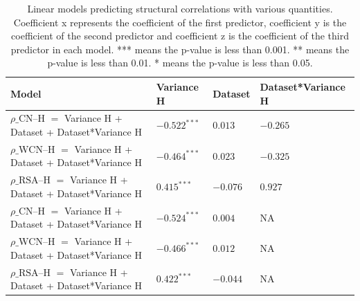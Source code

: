 \documentclass[12pt]{article}
\begin{document}
\begin{center}
	\begin{table}[H]
	\begin{tabular}{ | p{5.0cm} | p{3cm} | p{3cm} | p{4cm} | }
	\hline
	Model & Variance H  & Dataset & Dataset*Variance H \\	
	\hline
	$\rho  \text{\_CN--H}$ $ = $ Variance H + Dataset + Dataset*Variance H & $-0.522^{***}$ &  $0.013$ & $-0.265$ \\[1.3cm] 	
	
	$\rho  \text{\_WCN--H}$ $ = $ Variance H + Dataset + Dataset*Variance H& $-0.464^{***}$ &  $0.023$ & $-0.325$ \\ [1.3cm] 	
	
	$\rho  \text{\_RSA--H}$ $ = $ Variance H + Dataset + Dataset*Variance H & $0.415^{***}$ & $-0.076$ & $0.927$ \\	
	
		$\rho  \text{\_CN--H}$ $ = $ Variance H + Dataset + Dataset*Variance H & $-0.524^{***}$ &  $0.004$ & NA \\[1.3cm] 	
	
	$\rho  \text{\_WCN--H}$ $ = $ Variance H + Dataset + Dataset*Variance H& $-0.466 ^{***}$ &  $ 0.012$ & NA \\ [1.3cm] 	
	
	$\rho  \text{\_RSA--H}$ $ = $ Variance H + Dataset + Dataset*Variance H & $0.422^{***}$ & $-0.044$ & NA \\	
	
	
	\hline
	\end{tabular}
	\caption{Linear models predicting structural correlations with various quantities. Coefficient x represents the coefficient of the first predictor, coefficient y is the coefficient of the second predictor and coefficient z is the coefficient of the third predictor in each model.  *** means the p-value is less than 0.001. ** means the p-value is less than 0.01.  * means the p-value is less than 0.05. }
	\label{table:model_stats}
	\end{table}
\end{center}
\end{document}
